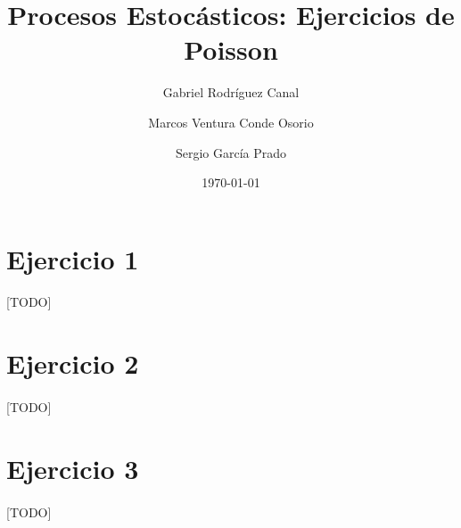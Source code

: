 \documentclass[a4paper, spanish]{article}
\title{Procesos Estocásticos: Ejercicios de Poisson}
\author{
  Gabriel Rodríguez Canal \and
  Marcos Ventura Conde Osorio \and
  Sergio García Prado
}
\date{\today}
\begin{document}
  \maketitle

  \section{Ejercicio 1}

    \paragraph{}
    [TODO]

  \section{Ejercicio 2}

    \paragraph{}
    [TODO]

  \section{Ejercicio 3}

    \paragraph{}
    [TODO]
\end{document}
